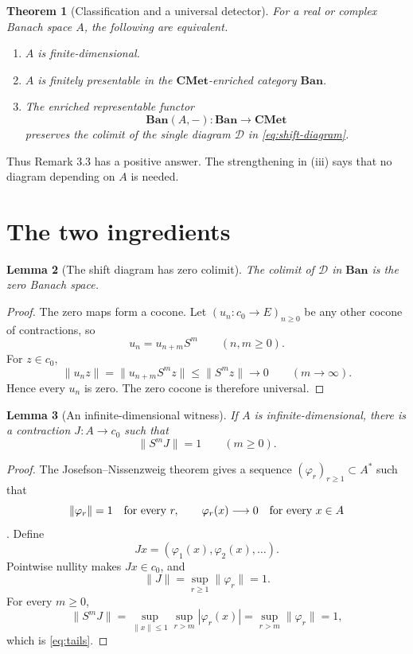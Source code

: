 \documentclass[11pt]{article}
\newtheorem{theorem}{Theorem}
\newtheorem{lemma}[theorem]{Lemma}
\newcommand{\Ban}{\mathbf{Ban}}
\newcommand{\CMet}{\mathbf{CMet}}
\begin{document}
\begin{theorem}[Classification and a universal detector]\label{thm:main}
For a real or complex Banach space $A$, the following are equivalent.
\begin{enumerate}[label=\textnormal{(\roman*)}]
\item $A$ is finite-dimensional.
\item $A$ is finitely presentable in the $\CMet$-enriched category $\Ban$.
\item The enriched representable functor
\[
 \Ban(A,-):\Ban\longrightarrow\CMet
\]
preserves the colimit of the single diagram $\mathcal D$ in
\eqref{eq:shift-diagram}.
\end{enumerate}
\end{theorem}

Thus Remark 3.3 has a positive answer.  The strengthening in (iii) says that
no diagram depending on $A$ is needed.

\section{The two ingredients}

\begin{lemma}[The shift diagram has zero colimit]\label{lem:colimit}
The colimit of $\mathcal D$ in $\Ban$ is the zero Banach space.
\end{lemma}

\begin{proof}
The zero maps form a cocone.  Let $(u_n:c_0\to E)_{n\geq0}$ be any other
cocone of contractions, so
\[
 u_n=u_{n+m}S^m\qquad(n,m\geq0).
\]
For $z\in c_0$,
\[
 \|u_nz\|=\|u_{n+m}S^mz\|\leq\|S^mz\|\longrightarrow0
 \qquad(m\to\infty).
\]
Hence every $u_n$ is zero.  The zero cocone is therefore universal.
\end{proof}

\begin{lemma}[An infinite-dimensional witness]\label{lem:witness}
If $A$ is infinite-dimensional, there is a contraction $J:A\to c_0$ such
that
\begin{equation}\label{eq:tails}
 \|S^mJ\|=1\qquad(m\geq0).
\end{equation}
\end{lemma}

\begin{proof}
The Josefson--Nissenzweig theorem gives a sequence
$(\varphi_r)_{r\geq1}\subset A^*$ such that
\[
 \|\varphi_r\|=1\quad\hbox{for every }r,
 \qquad
 \varphi_r(x)\longrightarrow0\quad\hbox{for every }x\in A
\]
\cite{Josefson,BanakhGabriyelyan}.  Define
\[
 Jx=(\varphi_1(x),\varphi_2(x),\ldots).
\]
Pointwise nullity makes $Jx\in c_0$, and
\[
 \|J\|=\sup_{r\geq1}\|\varphi_r\|=1.
\]
For every $m\geq0$,
\[
 \|S^mJ\|
 =\sup_{\|x\|\leq1}\sup_{r>m}|\varphi_r(x)|
 =\sup_{r>m}\|\varphi_r\|=1,
\]
which is \eqref{eq:tails}.
\end{proof}
\end{document}
